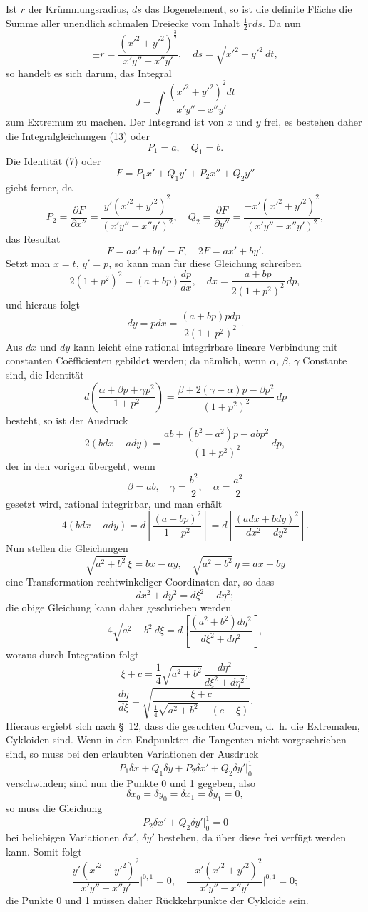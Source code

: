 \documentclass[11pt,a4paper,leqno]{article}
\begin{document}
Ist $r$ der Krümmungsradius, $ds$ das Bogenelement, so ist die definite Fläche die Summe aller unendlich schmalen Dreiecke vom Inhalt $\frac12 rds$. Da nun
\[
\pm r=\frac{(x'^2+y'^2)^{\frac32}}{x'y''-x''y'},\quad ds=\sqrt{x'^2+y'^2}\,dt,
\]
so handelt es sich darum, das Integral
\[
J=\int\frac{(x'^2+y'^2)^2dt}{x'y''-x''y'}
\]
zum Extremum zu machen. Der Integrand ist von $x$ und $y$ frei, es bestehen daher die Integralgleichungen (13) oder
\[
P_1=a,\quad Q_1=b.
\]
Die Identität (7) oder
\[
F=P_1x'+Q_1y'+P_2x''+Q_2y''
\]
giebt ferner, da
\[
P_2=\frac{\partial F}{\partial x''}=\frac{y'(x'^2+y'^2)^2}{(x'y''-x''y')^2},\quad
Q_2=\frac{\partial F}{\partial y''}=\frac{-x'(x'^2+y'^2)^2}{(x'y''-x''y')^2},
\]
das Resultat
\[
F=ax'+by'-F,\quad 2F=ax'+by'.
\]
Setzt man $x=t$, $y'=p$, so kann man für diese Gleichung schreiben
\[
2(1+p^2)^2=(a+bp)\frac{dp}{dx},\quad dx=\frac{a+bp}{2(1+p^2)^2}\,dp,
\]
und hieraus folgt
\[
dy=pdx=\frac{(a+bp)pdp}{2(1+p^2)^2}.
\]
Aus $dx$ und $dy$ kann leicht eine rational integrirbare lineare Verbindung mit constanten Coëfficienten gebildet werden; da nämlich, wenn $\alpha$, $\beta$, $\gamma$ Constante sind, die Identität
\[
d\left(\frac{\alpha+\beta p+\gamma p^2}{1+p^2}\right)
=\frac{\beta+2(\gamma-\alpha)p-\beta p^2}{(1+p^2)^2}\,dp
\]
besteht, so ist der Ausdruck
\[
2(bdx-ady)=\frac{ab+(b^2-a^2)p-abp^2}{(1+p^2)^2}\,dp,
\]
der in den vorigen übergeht, wenn
\[
\beta=ab,\quad \gamma=\frac{b^2}{2},\quad \alpha=\frac{a^2}{2}
\]
gesetzt wird, rational integrirbar, und man erhält
\[
4(bdx-ady)=d\left[\frac{(a+bp)^2}{1+p^2}\right]
=d\left[\frac{(adx+bdy)^2}{dx^2+dy^2}\right].
\]
Nun stellen die Gleichungen
\[
\sqrt{a^2+b^2}\,\xi=bx-ay,
\quad
\sqrt{a^2+b^2}\,\eta=ax+by
\]
eine Transformation rechtwinkeliger Coordinaten dar, so dass
\[
dx^2+dy^2=d\xi^2+d\eta^2;
\]
die obige Gleichung kann daher geschrieben werden
\[
4\sqrt{a^2+b^2}\,d\xi=d\left[\frac{(a^2+b^2)d\eta^2}{d\xi^2+d\eta^2}\right],
\]
woraus durch Integration folgt
\[
\xi+c=\frac14\sqrt{a^2+b^2}\,\frac{d\eta^2}{d\xi^2+d\eta^2},
\]
\[
\frac{d\eta}{d\xi}=\sqrt{\frac{\xi+c}{\frac14\sqrt{a^2+b^2}-(c+\xi)}}.
\]
Hieraus ergiebt sich nach \S~12, dass die gesuchten Curven, d.~h. die Extremalen, Cykloiden sind. Wenn in den Endpunkten die Tangenten nicht vorgeschrieben sind, so muss bei den erlaubten Variationen der Ausdruck
\[
P_1\delta x+Q_1\delta y+P_2\delta x'+Q_2\delta y'\bigg|_0^1
\]
verschwinden; sind nun die Punkte 0 und 1 gegeben, also
\[
\delta x_0=\delta y_0=\delta x_1=\delta y_1=0,
\]
so muss die Gleichung
\[
P_2\delta x'+Q_2\delta y'\bigg|_0^1=0
\]
bei beliebigen Variationen $\delta x'$, $\delta y'$ bestehen, da über diese frei verfügt werden kann. Somit folgt
\[
\frac{y'(x'^2+y'^2)^2}{x'y''-x''y'}\bigg|^{0,1}=0,
\quad
\frac{-x'(x'^2+y'^2)^2}{x'y''-x''y'}\bigg|^{0,1}=0;
\]
die Punkte 0 und 1 müssen daher Rückkehrpunkte der Cykloide sein.
\end{document}
